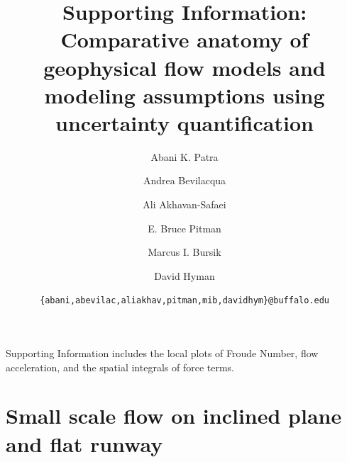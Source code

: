 \documentclass{article}
\begin{document}
\title{\bf Supporting Information: Comparative anatomy of geophysical flow models and modeling assumptions using uncertainty quantification}
\author[1,3]{Abani K. Patra}
\author[2]{Andrea Bevilacqua}
\author[1]{Ali Akhavan-Safaei}
\author[4]{E. Bruce Pitman}
\author[2]{Marcus I. Bursik}
\author[2]{David Hyman}


\date{\texttt{\{abani,abevilac,aliakhav,pitman,mib,davidhym\}@buffalo.edu}}

\maketitle
\tableofcontents
\newpage
Supporting Information includes the local plots of Froude Number, flow acceleration, and the spatial integrals of force terms.

\section{Small scale flow on inclined plane and flat runway}
\end{document}
